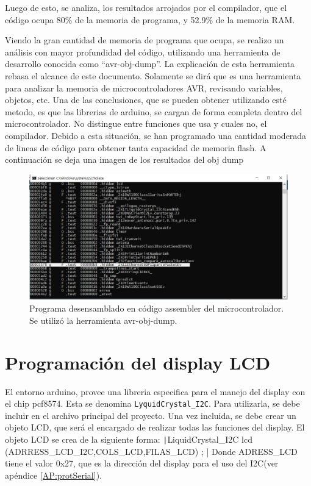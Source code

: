 Luego de esto, se analiza, los resultados arrojados por el compilador, que el código ocupa 80\% de la memoria de programa, y 52.9\% de la memoria RAM. 

Viendo la gran cantidad de memoria de programa que ocupa, se realizo un análisis con mayor profundidad del código, utilizando una herramienta de desarrollo conocida como ``avr-obj-dump''. La explicación de esta herramienta rebasa el alcance de este documento. Solamente se dirá que es una herramienta para analizar la memoria de microcontroladores AVR, revisando variables, objetos, etc. Una de las conclusiones, que se pueden obtener utilizando esté metodo, es que las librerias de arduino, se cargan de forma completa dentro del microcontrolador. No distingue entre funciones que usa y cuales no, el compilador. Debido a esta situación, se han programado una cantidad moderada de lineas de código para obtener tanta capacidad de memoria flash. A continuación se deja una imagen de los resultados del obj dump 

\begin{figure}[ht]
	\includegraphics{dump_memory}
	\caption{Programa desensamblado en código assembler del microcontrolador. Se utilizó la herramienta avr-obj-dump. }
\end{figure}

\section{Programación del display LCD} 

El entorno arduino, provee una libreria especifica para el manejo del display con el chip pcf8574. Esta se denomina \texttt{LyquidCrystal\_I2C}. Para utilizarla, se debe incluir en el archivo principal del proyecto. Una vez incluida, se debe crear un objeto LCD, que será el encargado de realizar todas las funciones del display. El objeto LCD se crea de la siguiente forma: 
\texttt|LiquidCrystal_I2C lcd (ADRRESS\_LCD_I2C,COLS\_LCD,FILAS\_LCD) ; |
Donde ADRESS\_LCD tiene el valor 0x27, que es la dirección del display para el uso del I2C(ver apéndice \ref{AP:protSerial}). 

